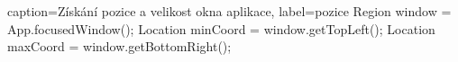 \begin{lstjava}{caption={Získání pozice a velikost okna aplikace}, label={pozice}}
Region window = App.focusedWindow();
Location minCoord = window.getTopLeft();
Location maxCoord = window.getBottomRight();
\end{lstjava}